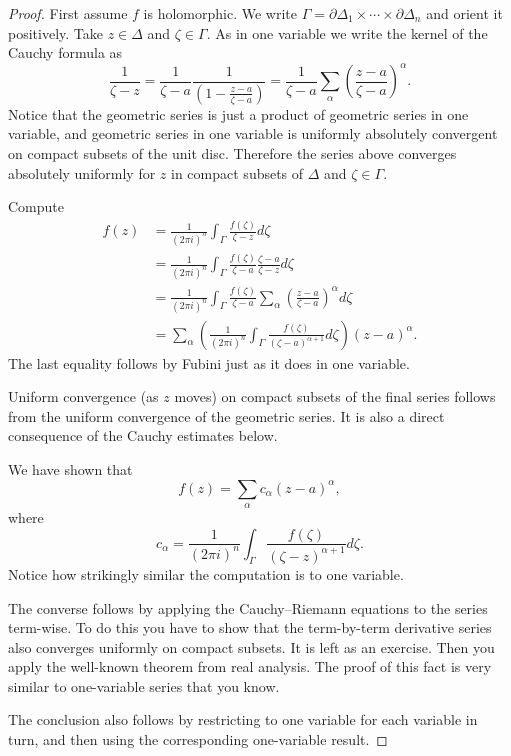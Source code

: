 \documentclass[12pt,openany]{book}
\theoremstyle{plain}
\theoremstyle{remark}
\theoremstyle{definition}
\theoremstyle{exercise}
\theoremstyle{example}
\begin{document}
\begin{proof}
First assume $f$ is holomorphic.
We write
$\Gamma = \partial \Delta_1 \times \cdots \times \partial \Delta_n$
and orient it positively.
Take $z \in \Delta$ and $\zeta \in \Gamma$.
As in one variable we write the kernel of the Cauchy
formula as
\begin{equation*}
\frac{1}{\zeta-z} =
\frac{1}{\zeta-a}\frac{1}{\left(1-\frac{z-a}{\zeta-a}\right)} =
\frac{1}{\zeta-a}
\sum_{\alpha}
{\left(\frac{z-a}{\zeta-a}\right)}^\alpha .
\end{equation*}
Notice that the geometric series is just a product of geometric series
in one variable, and geometric series in one variable
is uniformly absolutely convergent on compact subsets of the unit disc.
Therefore the series
above converges absolutely uniformly for $z$ in compact subsets of $\Delta$
and $\zeta \in \Gamma$.

Compute
\begin{equation*}
\begin{split}
f(z)
& =
\frac{1}{{(2\pi i)}^n}
\int_{\Gamma}
\frac{f(\zeta)}{\zeta-z}
d \zeta 
\\
& =
\frac{1}{{(2\pi i)}^n}
\int_{\Gamma}
\frac{f(\zeta)}{\zeta-a}
\frac{\zeta-a}{\zeta-z}
d \zeta 
\\
& =
\frac{1}{{(2\pi i)}^n}
\int_{\Gamma}
\frac{f(\zeta)}{\zeta-a}
\sum_{\alpha}
{\left(\frac{z-a}{\zeta-a}\right)}^{\alpha}
d \zeta 
\\
& =
\sum_{\alpha}
\left(
\frac{1}{{(2\pi i)}^n}
\int_{\Gamma}
\frac{f(\zeta)}{{(\zeta-a)}^{\alpha+1}}
d \zeta 
\right)
{(z-a)}^{\alpha} .
\end{split}
\end{equation*}
The last equality follows by Fubini just as it does in one variable.

Uniform convergence (as $z$ moves) on compact subsets of the final series follows from the
uniform convergence of the geometric series.  It is also a direct
consequence of the Cauchy estimates below.

We have shown that
\begin{equation*}
f(z) =
\sum_{\alpha}
c_{\alpha}
{(z-a)}^{\alpha} ,
\end{equation*}
where
\begin{equation*}
c_\alpha
=
\frac{1}{{(2\pi i)}^n}
\int_{\Gamma}
\frac{f(\zeta)}{{(\zeta-z)}^{\alpha+1}}
d \zeta .
\end{equation*}
Notice how strikingly similar the computation is to one variable.

The converse follows by applying the Cauchy--Riemann equations to the series
term-wise.  To do this you have to show that the term-by-term derivative
series also converges uniformly on compact subsets.  It is left as an
exercise.  Then you apply the well-known theorem from real analysis.
The proof of this fact is very similar to one-variable series that you know.

The conclusion also follows by restricting to one variable for each variable
in turn, and then using the corresponding one-variable result.
\end{proof}
\end{document}
